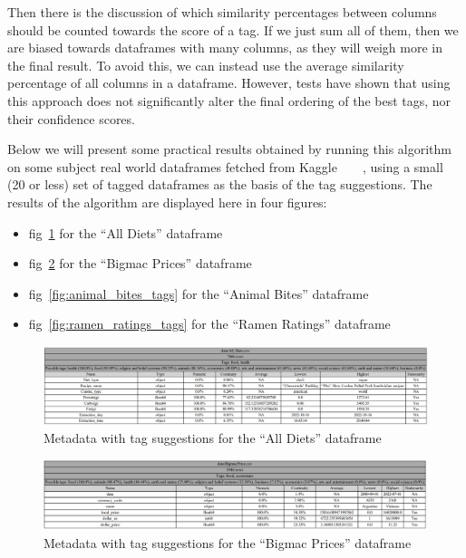 Then there is the discussion of which similarity percentages between columns should be counted towards the score of a tag.
If we just sum all of them, then we are biased towards dataframes with many columns, as they will weigh more in the final
result.
To avoid this, we can instead use the average similarity percentage of all columns in a dataframe.
However, tests have shown that using this approach does not significantly alter the final ordering of the best tags, nor
their confidence scores.

Below we will present some practical results obtained by running this algorithm on some subject real world dataframes fetched
from Kaggle~~~~\cite{kaggleHealthAnimalBites,kaggleBigmacPrices,kaggleAllDiets,kaggleRamenRatings}, using a small (20 or less)
set of tagged dataframes as the basis of the tag suggestions.
The results of the algorithm are displayed here in four figures:

\begin{itemize}
    \item fig~\ref{fig:all_diets_tags} for the ``All Diets'' dataframe
    \item fig~\ref{fig:bigmac_price_tags} for the ``Bigmac Prices'' dataframe
    \item fig~\ref{fig:animal_bites_tags} for the ``Animal Bites'' dataframe
    \item fig~\ref{fig:ramen_ratings_tags} for the ``Ramen Ratings'' dataframe
\end{itemize}

\begin{figure}[H]
    \centering
    \includegraphics[width=12cm]{figures/tag_suggestions/all_diets_tags}
    \caption{Metadata with tag suggestions for the ``All Diets'' dataframe}
    \label{fig:all_diets_tags}
\end{figure}

\begin{figure}[H]
    \centering
    \includegraphics[width=12cm]{figures/tag_suggestions/bigmac_price_tags}
    \caption{Metadata with tag suggestions for the ``Bigmac Prices'' dataframe}
    \label{fig:bigmac_price_tags}
\end{figure}

